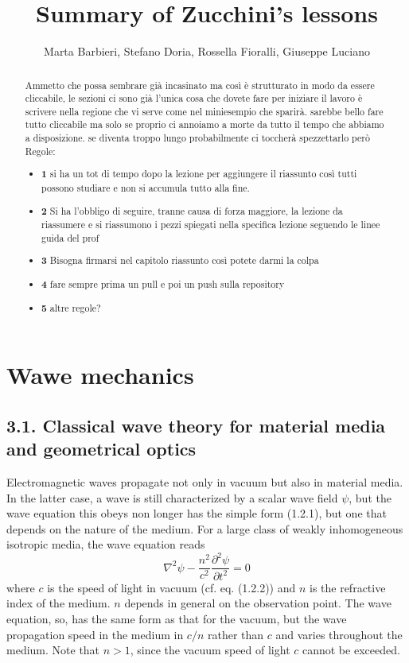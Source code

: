 \documentclass{article}
\title{Summary of Zucchini’s lessons}
\author{Marta Barbieri, Stefano Doria, Rossella Fioralli, Giuseppe Luciano}
\begin{document}
\maketitle
\begin{abstract}
    Ammetto che possa sembrare già incasinato ma così è strutturato in modo da essere cliccabile, le sezioni ci sono già l'unica cosa che dovete fare per iniziare il lavoro è scrivere nella regione che vi serve come nel miniesempio che sparirà. sarebbe bello fare tutto cliccabile ma solo se proprio ci annoiamo a morte da tutto il tempo che abbiamo a disposizione. se diventa troppo lungo probabilmente ci toccherà spezzettarlo però
    Regole:
    \begin{itemize}
\item \textbf{1} 
 si ha un tot di tempo dopo la lezione per aggiungere il riassunto così tutti possono studiare e non si accumula tutto alla fine. 
 
\item \textbf{2} 
Si ha l'obbligo di seguire, tranne causa di forza maggiore, la lezione da riassumere e si riassumono i pezzi spiegati nella specifica lezione seguendo le linee guida del prof 
\item \textbf{3}
Bisogna firmarsi nel capitolo riassunto così potete darmi la colpa
\item \textbf{4}
fare sempre prima un pull e poi un push sulla repository
\item \textbf{5}
altre regole?
\end{itemize}
   
\end{abstract}

\tableofcontents
\section*{Wawe mechanics}
\subsection*{3.1. Classical wave theory for material media and geometrical optics}

Electromagnetic waves propagate not only in vacuum but also in material media. In the latter case, a wave is still characterized by a scalar wave field $\psi$, but the wave equation this obeys non longer has the simple form (1.2.1), but one that depends on the nature of the medium. For a large class of weakly inhomogeneous isotropic media, the wave equation reads
$$
\begin{equation*}
\nabla^{2} \psi-\frac{n^{2}}{c^{2}} \frac{\partial^{2} \psi}{\partial t^{2}}=0 \tag{3.1.1}
\end{equation*}
$$
where $c$ is the speed of light in vacuum (cf. eq. (1.2.2)) and $n$ is the refractive index of the medium. $n$ depends in general on the observation point. The wave equation, so, has the same form as that for the vacuum, but the wave propagation speed in the medium in $c / n$ rather than $c$ and varies throughout the medium. Note that $n>1$, since the vacuum speed of light $c$ cannot be exceeded.
\end{document}
